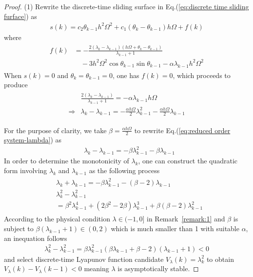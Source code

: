 \documentclass[10pt,final,journal]{IEEEtran}
\begin{document}
	\begin{proof}
  (1) Rewrite the discrete-time sliding surface in Eq.(\ref{eq:discrete time sliding furface}) as
	\begin{align}
		s(k) = c_2\theta_{k-1}h^2\Omega^2+c_1(\theta_k-\theta_{k-1})h\Omega+f(k)
	\end{align}
	where
	\begin{align}\begin{split}
		f(k) &=-\frac{2(\lambda_k-\lambda_{k-1})(h\Omega+\theta_k-\theta_{k-1})}{\lambda_{k-1}+1}\\
		&\quad-3h^2\Omega^2\cos\theta_{k-1}\sin\theta_{k-1}-\alpha\lambda_{k-1}h^2\Omega^2
	\end{split}\end{align}
	When $s(k)=0$ and $\theta_k=\theta_{k-1}=0$, one has $f(k)=0$, which proceeds to produce
	\begin{align}\begin{split}\label{eq:reduced order  system-lambda}
		&\frac{2(\lambda_k-\lambda_{k-1})}{\lambda_{k-1}+1}=-\alpha\lambda_{k-1}h\Omega\\
		\Rightarrow&\lambda_k-\lambda_{k-1} = -\frac{\alpha h\Omega}{2}\lambda_{k-1}^2-\frac{\alpha h\Omega}{2}\lambda_{k-1}
	\end{split}\end{align}
	
	For the purpose of clarity, we take $\beta = \frac{\alpha h\Omega}{2}$ to rewrite Eq.(\ref{eq:reduced order  system-lambda}) as
	\begin{align}\label{eq:lambda_k-lambda_k-1}
		&\lambda_k-\lambda_{k-1} = -\beta\lambda_{k-1}^2-\beta\lambda_{k-1}
	\end{align}
	In order to determine the monotonicity of $\lambda_k$, one can construct the quadratic form involving $\lambda_k$ and $\lambda_{k-1}$ as the following process
	\begin{align}\begin{split}
		&\lambda_k+\lambda_{k-1}  = -\beta\lambda_{k-1}^2-(\beta-2)\lambda_{k-1}\\
		&\lambda_k^2-\lambda_{k-1}^2\\
		& = \beta^2\lambda_{k-1}^4+(2\beta^2-2\beta)\lambda_{k-1}^3+\beta(\beta-2)\lambda_{k-1}^2
	\end{split}\end{align}
	According to the physical condition $\lambda\in(-1,0]$ in Remark~\ref{remark:1} and $\beta$ is subject to $\beta\left(\lambda_{k-1}+1\right)\in(0,2)$ which is much smaller than 1 with suitable $\alpha$, an inequation follows
	\begin{align}
		\lambda_k^2-\lambda_{k-1}^2 =\beta\lambda^2_{k-1}(\beta\lambda_{k-1}+\beta-2)(\lambda_{k-1}+1)<0
	\end{align} 
  and select discrete-time Lyapunov function candidate $V_\lambda(k)=\lambda_k^2$ to obtain $V_\lambda(k)-V_\lambda(k-1)<0$ meaning $\lambda$ is asymptotically stable. 


\end{proof}
\end{document}
